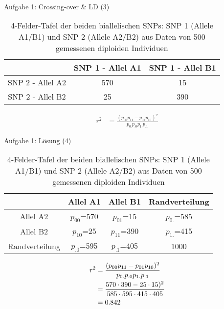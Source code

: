 \documentclass{beamer}
\begin{document}
\begin{frame}{Aufgabe 1: Crossing-over \& LD (3)}
\begin{table}[h]
\caption{4-Felder-Tafel der beiden biallelischen SNPs: SNP 1 (Allele A1/B1) und SNP 2 (Allele A2/B2) aus Daten von 500 gemessenen diploiden Individuen} \label{tab:4FT} 
\begin{center}
\begin{tabular}[h]{c|cc}
 & SNP 1 - Allel A1 & SNP 1 - Allel B1 \\
\hline
SNP 2 - Allel A2 & 570 & 15 \\
SNP 2 - Allel B2 & 25 & 390 \\
\end{tabular}
\end{center}
\end{table} 

\begin{align*}
r^2 &= \frac{(p_{00}p_{11} - p_{01}p_{10})^2}{p_{0.}p_{.0}p_{1.}p_{.1}} 
\end{align*}

\end{frame}

\begin{frame}{Aufgabe 1: Lösung (4)}
\begin{table}[h]
\caption{4-Felder-Tafel der beiden biallelischen SNPs: SNP 1 (Allele A1/B1) und SNP 2 (Allele A2/B2) aus Daten von 500 gemessenen diploiden Individuen} \label{tab:4FT_L} 
\begin{center}
\begin{tabular}[h]{c|cc|c}
 & Allel A1 & Allel B1 & Randverteilung \\
\hline
Allel A2 & $p_{00}$=570 & $p_{01}$=15 & $p_{0.}$=585 \\
Allel B2 & $p_{10}$=25 & $p_{11}$=390 & $p_{1.}$=415 \\
\hline
Randverteilung & $p_{.0}$=595 & $p_{.1}$=405 & 1000
\end{tabular}
\end{center}
\end{table}

\begin{align*}
r^2 &= \frac{(p_{00}p_{11} - p_{01}p_{10})^2}{p_{0.}p_{.0}p_{1.}p_{.1}}  \\
 &= \frac{570 \cdot 390 - 25 \cdot 15)^2}{585 \cdot 595 \cdot 415 \cdot 405}  \\
 &= 0.842 \notag \\
\end{align*}
\end{frame}
\end{document}
